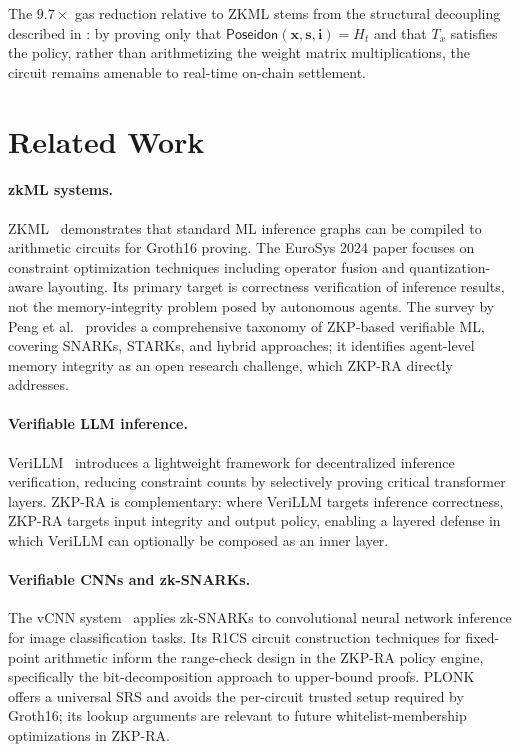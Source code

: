 \documentclass[final,5p,times,twocolumn]{elsarticle}
\theoremstyle{plain}
\theoremstyle{definition}
\theoremstyle{remark}
\newcommand{\poseidon}{\textsf{Poseidon}}
\begin{document}
The $9.7\times$ gas reduction relative to ZKML stems from the structural
decoupling described in : by proving only that
$\poseidon(\mathbf{x}, \mathbf{s}, \mathbf{i}) = H_t$ and that $T_x$ satisfies
the policy, rather than arithmetizing the weight matrix multiplications,
the circuit remains amenable to real-time on-chain settlement.

\section{Related Work}
\label{sec:related}

\paragraph{zkML systems.}
ZKML~\cite{chen2024zkml} demonstrates that standard ML inference graphs can be
compiled to arithmetic circuits for Groth16 proving. The EuroSys 2024 paper
focuses on constraint optimization techniques including operator fusion and
quantization-aware layouting. Its primary target is correctness verification of
inference results, not the memory-integrity problem posed by autonomous agents.
The survey by Peng et al.~\cite{peng2025survey} provides a comprehensive taxonomy
of ZKP-based verifiable ML, covering SNARKs, STARKs, and hybrid approaches;
it identifies agent-level memory integrity as an open research challenge, which
ZKP-RA directly addresses.

\paragraph{Verifiable LLM inference.}
VeriLLM~\cite{verillm2025} introduces a lightweight framework for decentralized
inference verification, reducing constraint counts by selectively proving
critical transformer layers. ZKP-RA is complementary: where VeriLLM targets
inference correctness, ZKP-RA targets input integrity and output policy, enabling
a layered defense in which VeriLLM can optionally be composed as an inner layer.

\paragraph{Verifiable CNNs and zk-SNARKs.}
The vCNN system~\cite{vcnn2024} applies zk-SNARKs to convolutional neural
network inference for image classification tasks. Its R1CS circuit construction
techniques for fixed-point arithmetic inform the range-check design in the
ZKP-RA policy engine, specifically the bit-decomposition approach to upper-bound
proofs. PLONK~\cite{plonk2019} offers a universal SRS and avoids the per-circuit
trusted setup required by Groth16; its lookup arguments are relevant to future
whitelist-membership optimizations in ZKP-RA.
\end{document}
